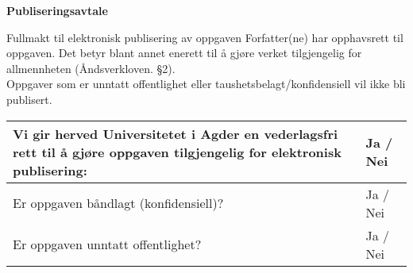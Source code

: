 \bigskip

\large{\bf{Publiseringsavtale}} \\

{\small {} Fullmakt til elektronisk publisering av oppgaven
Forfatter(ne) har opphavsrett til oppgaven. Det betyr blant annet enerett til å gjøre verket tilgjengelig for allmennheten (Åndsverkloven. §2).
\\
Oppgaver som er unntatt offentlighet eller taushetsbelagt/konfidensiell vil ikke bli publisert.\\

\begin{center}
\begin{tabular}{ |p{13cm}|p{1cm}|}
\hline
Vi gir herved Universitetet i Agder en vederlagsfri rett til å gjøre oppgaven tilgjengelig for elektronisk publisering: & Ja / Nei \\
\hline
Er oppgaven båndlagt (konfidensiell)? & Ja / Nei \\
\hline
Er oppgaven unntatt offentlighet? & Ja / Nei \\
\hline
\end{tabular}
\end{center}
}